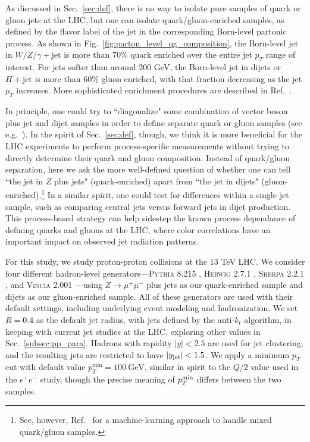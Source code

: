 \documentclass[11pt,letterpaper]{article}
\newcommand{\GeV}{\text{GeV}}
\DeclareRobustCommand{\Sec}[1]{Sec.~\ref{#1}}
\DeclareRobustCommand{\Fig}[1]{Fig.~\ref{#1}}
\DeclareRobustCommand{\Ref}[1]{Ref.~\cite{#1}}
\begin{document}
As discussed in \Sec{sec:def}, there is no way to isolate pure samples of quark or gluon jets at the LHC, but one can isolate quark/gluon-enriched samples, as defined by the flavor label of the jet in the corresponding Born-level partonic process.  As shown in \Fig{fig:parton_level_qg_composition}, the Born-level jet in $W/Z/\gamma + \text{jet}$ is more than 70\% quark enriched over the entire jet $p_T$ range of interest.  For jets softer than around 200 GeV, the Born-level jet in dijets or $H+\text{jet}$ is more than 60\% gluon enriched, with that fraction decreasing as the jet $p_T$ increases.  More sophisticated enrichment procedures are described in \Ref{Gallicchio:2011xc}.

In principle, one could try to ``diagonalize" some combination of vector boson plus jet and dijet samples in order to define separate quark or gluon samples (see e.g.~\cite{Aad:2014gea}).  In the spirit of \Sec{sec:def}, though, we think it is more beneficial for the LHC experiments to perform process-specific measurements without trying to directly determine their quark and gluon composition.  Instead of quark/gluon separation, here we ask the more well-defined question of whether one can tell ``the jet in $Z$ plus jets" (quark-enriched) apart from ``the jet in dijets" (gluon-enriched).\footnote{See, however, \Ref{Dery:2017fap} for a machine-learning approach to handle mixed quark/gluon samples.}  In a similar spirit, one could test for differences within a single jet sample, such as comparing central jets versus forward jets in dijet production.  This process-based strategy can help sidestep the known process dependance of defining quarks and gluons at the LHC, where color correlations have an important impact on observed jet radiation patterns.

For this study, we study proton-proton collisions at the 13 TeV LHC.  We consider four different hadron-level generators---\textsc{Pythia 8.215} \cite{Sjostrand:2014zea}, \textsc{Herwig 2.7.1} \cite{Bahr:2008pv,Bellm:2013hwb}, \textsc{Sherpa 2.2.1} \cite{Gleisberg:2008ta}, and \textsc{Vincia 2.001} \cite{Fischer:2016vfv}---using $Z \to \mu^+ \mu^-$ plus jets as our quark-enriched sample and dijets as our gluon-enriched sample.  All of these generators are used with their default settings, including underlying event modeling and hadronization.  We set $R = 0.4$ as the default jet radius, with jets defined by the anti-$k_t$ algorithm, in keeping with current jet studies at the LHC, exploring other values in \Sec{subsec:pp_para}.  Hadrons with rapidity $|y| < 2.5$ are used for jet clustering, and the resulting jets are restricted to have $|y_{\rm jet}| < 1.5$.  We apply a minimum $p_T$ cut with default value $p^{\min}_T = 100~\GeV$, similar in spirit to the $Q/2$ value used in the $e^+e^-$ study, though the precise meaning of $p_T^{\rm min}$ differs between the two samples. 
\end{document}
